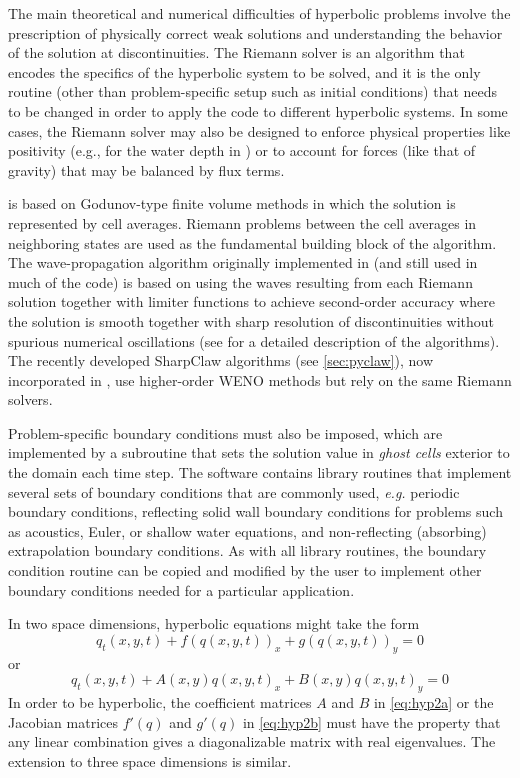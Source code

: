 The main theoretical and numerical difficulties of hyperbolic problems
involve the prescription of physically correct weak solutions and
understanding the behavior of the solution at discontinuities.  The
Riemann solver is an algorithm that encodes the specifics of the
hyperbolic system to be solved, and it is the only routine (other than
problem-specific setup such as initial conditions) 
that needs to be changed in order to apply the
code to different hyperbolic systems.  In some cases, the Riemann
solver may also be designed to enforce physical properties like
positivity (e.g., for the water depth in \geoclaw) or to account for
forces (like that of gravity) that may be balanced by flux terms.

\clawpack is based on Godunov-type finite volume methods in which
the solution is represented by cell averages.  Riemann problems
between the cell averages in neighboring states are used as the
fundamental building block of the algorithm.
The wave-propagation algorithm originally
implemented in \clawpack (and still used in much of the code) is based on
using the waves resulting from each Riemann solution together with limiter
functions to achieve second-order accuracy where the solution is smooth
together with sharp resolution of discontinuities without spurious numerical
oscillations (see \cite{rjl:fvmhp} for a detailed description of the
algorithms).   The recently developed SharpClaw algorithms (see
\cref{sec:pyclaw}), now incorporated in \pyclaw, use higher-order WENO methods
but rely on the same Riemann solvers.

Problem-specific boundary conditions must also be imposed, which
are implemented by a subroutine that sets the solution value in
{\em ghost cells} exterior to the domain each time step.  The
\clawpack software contains library routines that implement several
sets of boundary conditions that are commonly used, {\em e.g.}
periodic boundary conditions, reflecting solid wall boundary
conditions for problems such as acoustics, Euler, or shallow water
equations, and non-reflecting (absorbing) extrapolation boundary
conditions.  As with all \clawpack library routines, the boundary
condition routine can be copied and modified by the user to implement
other boundary conditions needed for a particular application.

In two space dimensions, hyperbolic equations might take the form
\begin{equation}\label{eq:hyp2a}
q_t(x,y,t) + f(q(x,y,t))_x + g(q(x,y,t))_y = 0
\end{equation}
or
\begin{equation}\label{eq:hyp2b}
q_t(x,y,t) + A(x,y)q(x,y,t)_x + B(x,y)q(x,y,t)_y = 0
\end{equation}
In order to be hyperbolic, the coefficient matrices $A$ and $B$ in \cref{eq:hyp2a}
or the Jacobian matrices $f'(q)$ and $g'(q)$ in \cref{eq:hyp2b}
must have the property that any linear
combination gives a diagonalizable matrix with real eigenvalues.  The
extension to three space dimensions is similar.

